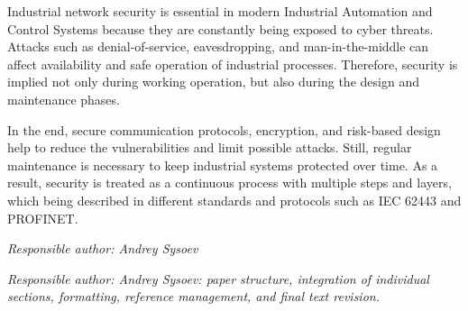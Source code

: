 \documentclass[conference]{IEEEtran}
\begin{document}
Industrial network security is  essential in modern Industrial Automation and Control Systems because they are constantly being exposed to cyber threats. Attacks such as denial-of-service, eavesdropping, and man-in-the-middle can affect availability and safe operation of industrial processes. Therefore, security is implied not only during working operation, but also during the design and maintenance phases.

In the end, secure communication protocols, encryption, and risk-based design help to reduce the vulnerabilities  and limit  possible attacks. Still, regular maintenance is necessary to keep industrial systems protected over time. As a result, security is treated as a continuous process with multiple steps and layers, which being described in different standards and protocols such as IEC 62443 and PROFINET.

\textit{Responsible author: Andrey Sysoev}


\textit{Responsible author: Andrey Sysoev: paper structure, integration of individual sections, formatting, reference management, and final text revision.}
 \clearpage


\vspace{12pt}
\end{document}
